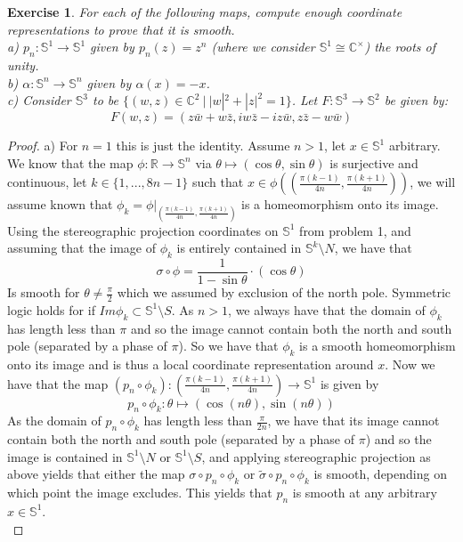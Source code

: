 \documentclass{article}
\newcommand{\bb}[1]{\mathbb{#1}}
\newcommand{\iso}{\cong}
\newtheorem{exercise}{Exercise}
\begin{document}
\begin{exercise}
  For each of the following maps, compute enough coordinate representations to prove that it is smooth. \\
  a) $p_{n}:\bb{S}^{1} \to \bb{S}^{1}$ given by $p_{n}(z) = z^{n}$ (where we consider $\bb{S}^{1} \iso \bb{C}^{\times}$) the roots of unity.\\
  b) $\alpha : \bb{S}^{n} \to \bb{S}^{n}$ given by $\alpha(x) = -x$.\\
  c) Consider $\bb{S}^{3}$ to be $\{(w,z) \in \bb{C}^{2} \ | \ |w|^{2} + |z|^{2} = 1\}$. Let $F: \bb{S}^{3} \to \bb{S}^{2}$ be given by:
  \[
    F(w,z) = (z\bar{w} + w\bar{z}, iw\bar{z} - iz\bar{w}, z\bar{z} - w\bar{w})
    \]
\end{exercise}
\begin{proof}
  a) For $n =1$ this is just the identity. Assume $n>1$, let $x \in \bb{S}^{1}$ arbitrary. We know that the map $\phi:\bb{R} \to \bb{S}^{n}$ via $\theta \mapsto (\cos\theta, \sin\theta)$ is surjective and continuous, let $k \in \{1,...,8n-1\}$ such that $x \in \phi((\frac{\pi (k-1)}{4n}, \frac{\pi (k+1)}{4n}))$, we will assume known that $\phi_{k} = \phi|_{(\frac{\pi (k-1)}{4n}, \frac{\pi (k+1)}{4n})}$ is a homeomorphism onto its image. Using the stereographic projection coordinates on $\bb{S}^{1}$ from problem 1, and assuming that the image of $\phi_{k}$ is entirely contained in $\bb{S}^{k}\setminus N$, we have that
  \[
    \sigma \circ \phi = \frac{1}{1 - \sin \theta} \cdot (\cos \theta)  
  \]
  Is smooth for $\theta \neq \frac{\pi}{2}$ which we assumed by exclusion of the north pole. Symmetric logic holds for if $Im \phi_{k} \subset \bb{S}^{1} \setminus S$. As $n > 1$, we always have that the domain of $\phi_{k}$ has length less than $\pi$ and so the image cannot contain both the north and south pole (separated by a phase of $\pi$). So we have that $\phi_{k}$ is a smooth homeomorphism onto its image and is thus a local coordinate representation around $x$. Now we have that the map $(p_{n} \circ \phi_{k}): (\frac{\pi (k-1)}{4n}, \frac{\pi (k+1)}{4n}) \to \bb{S}^{1}$ is given by
  \[
    p_{n} \circ \phi_{k}: \theta \mapsto (\cos (n\theta), \sin (n\theta))
  \]
  As the domain of $p_{n} \circ \phi_{k}$ has length less than $\frac{\pi}{2n}$, we have that its image cannot contain both the north and south pole (separated by a phase of $\pi$) and so the image is contained in $\bb{S}^{1} \setminus N$ or $\bb{S}^{1} \setminus S$, and applying stereographic projection as above yields that either the map $\sigma \circ p_{n} \circ \phi_{k}$ or $\widetilde{\sigma} \circ p_{n} \circ \phi_{k}$ is smooth, depending on which point the image excludes. This yields that $p_{n}$ is smooth at any arbitrary $x \in \bb{S}^{1}$. \\


\end{proof}
\end{document}
